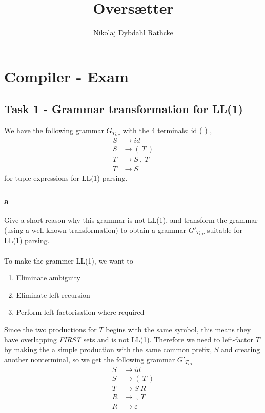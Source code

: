 \documentclass[12pt]{article}
\title{Oversætter}
\author{Nikolaj Dybdahl Rathcke}
\begin{document}
\section*{Compiler - Exam}

\subsection*{Task 1 - Grammar transformation for LL(1)}
We have the following grammar $G_{T_{UP}}$ with the 4 terminals: id ( ) ,
\begin{align*}
S &\rightarrow id \\
S &\rightarrow (\:T\:) \\
T &\rightarrow S\:,\:T \\
T &\rightarrow S
\end{align*}
for tuple expressions for LL(1) parsing.
\subsubsection*{a}
Give a short reason why this grammar is not LL(1), and transform the grammar (using a well-known transformation) to obtain a grammar $G'_{T_{UP}}$ suitable for LL(1) parsing.\\
\\
To make the grammer LL(1), we want to
\begin{enumerate}
\item Eliminate ambiguity
\item Eliminate left-recursion
\item Perform left factorisation where required
\end{enumerate}
Since the two productions for $T$ begins with the same symbol, this means they have overlapping \textit{FIRST} sets and is not LL(1). Therefore we need to left-factor $T$ by making the a simple production with the same common prefix, $S$ and creating another nonterminal, so we get the following grammar $G'_{T_{UP}}$
\begin{align*}
S &\rightarrow id \\
S &\rightarrow (\:T\:) \\
T &\rightarrow S\:R \\
R &\rightarrow \:,\:T \\
R &\rightarrow \varepsilon
\end{align*}
\end{document}
